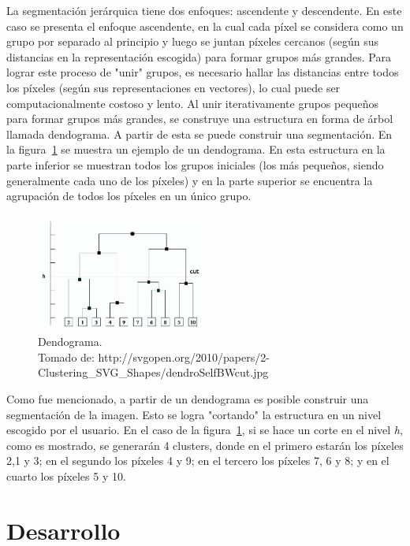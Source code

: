 \documentclass[10pt,twocolumn,letterpaper]{article}
\begin{document}
La segmentación jerárquica tiene dos enfoques: ascendente y descendente. En este caso se presenta el enfoque ascendente, en la cual cada píxel se considera como un grupo por separado al principio y luego se juntan píxeles cercanos (según sus distancias en la representación escogida) para formar grupos más grandes. Para lograr este proceso de "unir" grupos, es necesario hallar las distancias entre todos los píxeles (según sus representaciones en vectores), lo cual puede ser computacionalmente costoso y lento. Al unir iterativamente grupos pequeños para formar grupos más grandes, se construye una estructura en forma de árbol llamada dendograma. A partir de esta se puede construir una segmentación. En la figura~\ref{fig:dendograma} se muestra un ejemplo de un dendograma. En esta estructura en la parte inferior se muestran todos los grupos iniciales (los más pequeños, siendo generalmente cada uno de los píxeles) y en la parte superior se encuentra la agrupación de todos los píxeles en un único grupo.

\begin{figure}[h]
    \centering
    \includegraphics[width=0.5\textwidth]{Dendograma.jpg}
    \caption{Dendograma.\\Tomado de: http://svgopen.org/2010/papers/2-				Clustering_SVG_Shapes/dendroSelfBWcut.jpg}
    \label{fig:dendograma}
\end{figure}

Como fue mencionado, a partir de un dendograma es posible construir una segmentación de la imagen. Esto se logra "cortando" la estructura en un nivel escogido por el usuario. En el caso de la figura~\ref{fig:dendograma}, si se hace un corte en el nivel \textit{h}, como es mostrado, se generarán 4 clusters, donde en el primero estarán los píxeles 2,1 y 3; en el segundo los píxeles 4 y 9; en el tercero los píxeles 7, 6 y 8; y en el cuarto los píxeles 5 y 10.


\section{Desarrollo}
\end{document}

